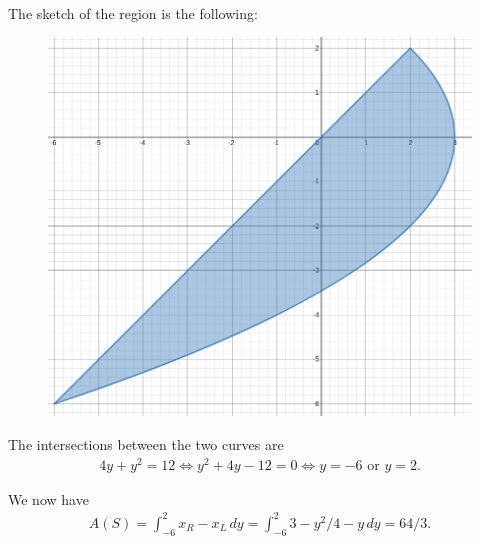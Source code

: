 	\newpage
	
	\\
	The sketch of the region is the following:
		\begin{figure}[h]
		\centering
		\includegraphics[scale=0.3]{exo-12}
		\end{figure}
		
	The intersections between the two curves are
		\begin{align*}
		4y + y^2 = 12 \iff y^2 + 4y - 12 = 0 \iff y = -6 \text{ or } y = 2 .
		\end{align*}
		
	We now have
		\begin{align*}
		A(S) = \int_{-6}^2 x_R - x_L \, dy = \int_{-6}^2 3 - y^2/4 - y \, dy = 64/3 .
		\end{align*}
		
	\newpage
	
